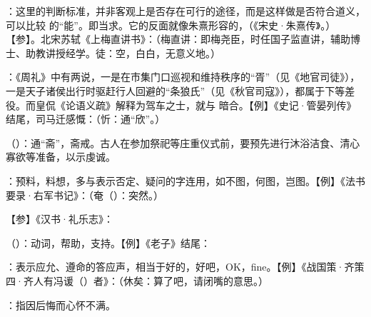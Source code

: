 {
\item {}：这里的判断标准，并非客观上是否存在可行的途径，而是这样做是否符合道义，可以比较  的“能”。即当求。它的反面就像朱熹形容的，（《宋史·朱熹传》。）【参】。北宋苏轼《上梅直讲书》：（梅直讲：即梅尧臣，时任国子监直讲，辅助博士、助教讲授经学。徒：空，白白，无意义地。）
\item {}：《周礼》中有两说，一是在市集门口巡视和维持秩序的“胥”（见《地官司徒》），一是天子诸侯出行时驱赶行人回避的“条狼氏”（见《秋官司寇》），都属于下等差役。而皇侃《论语义疏》解释为驾车之士，就与  暗合。【例】《史记·管晏列传》结尾，司马迁感慨：（忻：通“欣”。）
}
{}


{
\item {}（）：通“斋”，斋戒。古人在参加祭祀等庄重仪式前，要预先进行沐浴洁食、清心寡欲等准备，以示虔诚。
}
{}


{
\item {}：预料，料想，多与表示否定、疑问的字连用，如不图，何图，岂图。【例】《法书要录·右军书记》：（奄（）：突然。）%

【参】《汉书·礼乐志》：
}
{}


{
\item {}（）：动词，帮助，支持。【例】《老子》结尾：
\item {}：表示应允、遵命的答应声，相当于好的，好吧，OK，fine。【例】《战国策·齐策四·齐人有冯谖（）者》：（休矣：算了吧，请闭嘴的意思。）
\item {}：指因后悔而心怀不满。
}
{}  %


